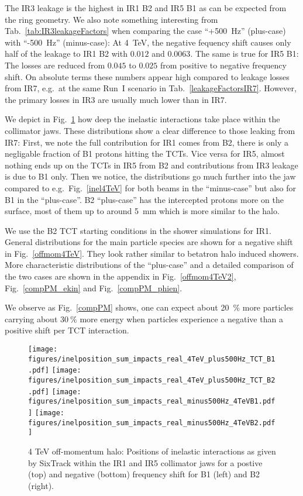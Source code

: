 The IR3 leakage is the highest in IR1 B2 and IR5 B1 as can be expected from the ring geometry. We also note something interesting from Tab.~\ref{tab:IR3leakageFactors} when comparing the case ``+500~Hz'' (plus-case) with ``-500~Hz'' (minus-case): At 4~TeV, the negative fequency shift causes only half of the leakage to IR1 B2 with $0.012$ and $0.0063$. The same is true for IR5 B1: The losses are reduced from $0.045$ to $0.025$ from positive to negative frequency shift. On absolute terms these numbers appear high compared to leakage losses from IR7, e.g.~at the same Run~I scenario in Tab.~\ref{leakageFactorsIR7}. However, the primary losses in IR3 are usually much lower than in IR7.

We depict in Fig.~\ref{inel4TeVOffmom} how deep the inelastic interactions take place within the collimator jaws. These distributions show a clear difference to those leaking from IR7: First, we note the full contribution for IR1 comes from B2, there is only a negligable fraction of B1 protons hitting the TCTs. Vice versa for IR5, almost nothing ends up on the TCTs in IR5 from B2 and contributions from IR3 leakage is due to B1 only. Then we notice, the distributions go much further into the jaw compared to e.g.~Fig.~\ref{inel4TeV} for both beams in the ``minus-case'' but also for B1 in the ``plus-case''. B2 ``plus-case'' has the intercepted protons more on the surface, most of them up to around 5~mm which is more similar to the halo. 

We use the B2 TCT starting conditions in the shower simulations for IR1. General distributions for the main particle species are shown for a negative shift in Fig.~\ref{offmom4TeV}. They look rather similar to betatron halo induced showers. More characteristic distributions of the ``plus-case'' and a detailed comparison of the two cases are shown in the appendix in Fig.~\ref{offmom4TeV2}, Fig.~\ref{compPM_ekin} and Fig.~\ref{compPM_phien}.

We observe as Fig.~\ref{compPM} shows, one can expect about 20~$\%$ more particles carrying about 30$~\%$ more energy when particles experience a negative than a positive shift per TCT interaction.


\begin{figure}
\begin{center}
\texttt{[image: figures/inelposition\_sum\_impacts\_real\_4TeV\_plus500Hz\_TCT\_B1.pdf]}
\texttt{[image: figures/inelposition\_sum\_impacts\_real\_4TeV\_plus500Hz\_TCT\_B2.pdf]}
\texttt{[image: figures/inelposition\_sum\_impacts\_real\_minus500Hz\_4TeVB1.pdf]}
\texttt{[image: figures/inelposition\_sum\_impacts\_real\_minus500Hz\_4TeVB2.pdf]}
\end{center}
\vspace{-0.6cm}
 \caption{4 TeV off-momentum halo: Positions of inelastic interactions as given by SixTrack within the IR1 and IR5 collimator jaws for a postive (top) and negative (bottom) frequency shift for B1 (left) and B2 (right).
  \label{inel4TeVOffmom}}
\end{figure}


